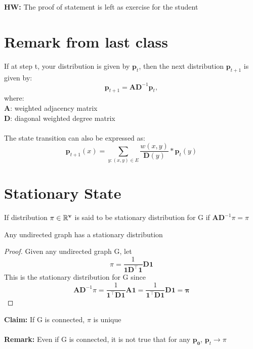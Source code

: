 \documentclass[11pt]{article}
\begin{document}
\newcommand{\coursenum}{{CSC 2421H}}
\newcommand{\coursename}{{Graphs, Matrices, and Optimization}}
\newcommand{\courseprof}{Sushant Sachdeva}

\textbf{HW:} The proof of statement is left as exercise for the student
\section{Remark from last class}
\label{sec:goal}

If at step t, your distribution is given by $\mathbf{p}_{t}$, then the next distribution $\mathbf{p}_{t+1}$ is given by: 
\begin{equation}
    \mathbf{p}_{t+1} = \mathbf{AD}^{-1}\mathbf{p}_{t},
\end{equation}
where:\\
\textbf{A}: weighted adjacency matrix\\
\textbf{D}: diagonal weighted degree matrix\\\\
The state transition can also be expressed as:
\begin{equation*}
    \mathbf{p}_{t+1}(x) = \sum_{y:(x,y) \in E} \frac{w(x,y)}{\mathbf{D}(y)}*\mathbf{p}_{t}(y)
\end{equation*}

\section{Stationary State}
\begin{definition}
    If distribution $\mathbf{\pi \in \mathbb R^v}$ is said to be stationary distribution for G if $\mathbf{AD}^{-1}\pi = \pi$ 
\end{definition}

\begin{lemma}
Any undirected graph has a stationary distribution
\end{lemma}

\begin{proof}
Given any undirected graph G, let
\begin{equation*}
    \pi = \frac{1}{\mathbf{1D^\top1}}\mathbf{D1}
\end{equation*}
This is the stationary distribution for G since
\begin{equation*}
    \mathbf{AD}^{-1}\pi = \frac{1}{\mathbf{1^\top D1}}\mathbf{A1} = \frac{1}{\mathbf{1^\top D1}}\mathbf{D1 = \pi}
\end{equation*}
\end{proof}
\textbf{Claim:}
If G is connected, $\pi$ is unique\\\\
\textbf{Remark:}
Even if G is connected, it is not true that for any $\mathbf{p_0}$, $\mathbf{p}_t \rightarrow \pi$\\
\end{document}
